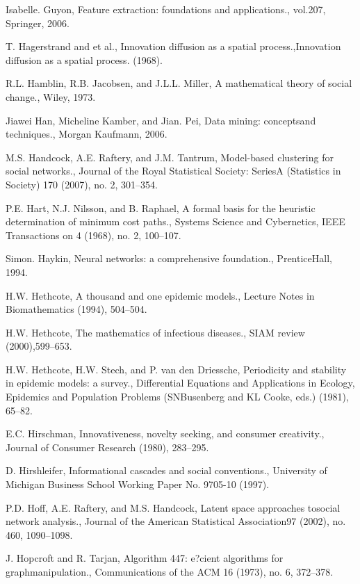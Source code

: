 \begin{thebibliography}{999}
 Isabelle. Guyon, Feature extraction: foundations and applications., vol.207, Springer, 2006.

 T. Hagerstrand and et al., Innovation diffusion as a spatial process.,Innovation diffusion as a spatial process. (1968).

 R.L. Hamblin, R.B. Jacobsen, and J.L.L. Miller, A mathematical theory of social change., Wiley, 1973.

 Jiawei Han, Micheline Kamber, and Jian. Pei, Data mining: conceptsand techniques., Morgan Kaufmann, 2006.

 M.S. Handcock, A.E. Raftery, and J.M. Tantrum, Model-based clustering for social networks., Journal of the Royal Statistical Society: SeriesA (Statistics in Society) 170 (2007), no. 2, 301–354.

 P.E. Hart, N.J. Nilsson, and B. Raphael, A formal basis for the heuristic determination of minimum cost paths., Systems Science and Cybernetics, IEEE Transactions on 4 (1968), no. 2, 100–107.

 Simon. Haykin, Neural networks: a comprehensive foundation., PrenticeHall, 1994.

 H.W. Hethcote, A thousand and one epidemic models., Lecture Notes in Biomathematics (1994), 504–504.

 H.W. Hethcote, The mathematics of infectious diseases., SIAM review (2000),599–653.

 H.W. Hethcote, H.W. Stech, and P. van den Driessche, Periodicity and stability in epidemic models: a survey., Differential Equations and Applications in Ecology, Epidemics and Population Problems (SNBusenberg and KL Cooke, eds.) (1981), 65–82.

 E.C. Hirschman, Innovativeness, novelty seeking, and consumer creativity., Journal of Consumer Research (1980), 283–295.

 D. Hirshleifer, Informational cascades and social conventions., University of Michigan Business School Working Paper No. 9705-10 (1997).

 P.D. Hoff, A.E. Raftery, and M.S. Handcock, Latent space approaches tosocial network analysis., Journal of the American Statistical Association97 (2002), no. 460, 1090–1098.

 J. Hopcroft and R. Tarjan, Algorithm 447: e?cient algorithms for graphmanipulation., Communications of the ACM 16 (1973), no. 6, 372–378.


\end{thebibliography}
